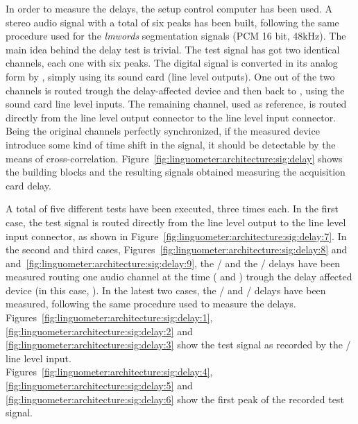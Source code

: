 In order to measure the delays, the setup control computer  has been 
used.
A stereo audio signal with a total of six peaks has been built, 
following the same procedure used for the \emph{lmwords} segmentation signals
(PCM 16 bit, 48kHz).
The main idea behind the delay test is trivial. The test signal has got two
identical channels, each one with six peaks.
The digital signal is converted in its analog form by , simply using
its sound card (line level outputs).
One out of the two channels is routed trough the delay-affected device and then
back to , using the sound card line level inputs.
The remaining channel, used as reference, is routed directly
from the line level output connector to the line level input connector.
Being the original channels perfectly synchronized, if the measured device
introduce some kind of time shift in the signal, it should be detectable by the
means of cross-correlation.
Figure~\ref{fig:linguometer:architecture:sig:delay} shows the building blocks
and the resulting signals obtained measuring the acquisition card delay.

A total of five different tests have been executed, three times each.
In the first case, the test signal is routed directly from the line level output
to the line level input connector, as shown in
Figure~\ref{fig:linguometer:architecture:sig:delay:7}.
In the second and third cases,
Figures~\ref{fig:linguometer:architecture:sig:delay:8} and
and~\ref{fig:linguometer:architecture:sig:delay:9},
the  / and
the / delays have been measured routing one audio channel
at the time ( and ) trough the delay affected
device (in this case, ).
In the latest two cases, the  / and 
/ delays have been measured, following the same
procedure used to measure the  delays.
Figures~\ref{fig:linguometer:architecture:sig:delay:1}, 
\ref{fig:linguometer:architecture:sig:delay:2} and
\ref{fig:linguometer:architecture:sig:delay:3} show the test signal 
as recorded by the  / line level input.\\
Figures~\ref{fig:linguometer:architecture:sig:delay:4}, 
\ref{fig:linguometer:architecture:sig:delay:5} and
\ref{fig:linguometer:architecture:sig:delay:6} show the
first peak of the recorded test signal.


